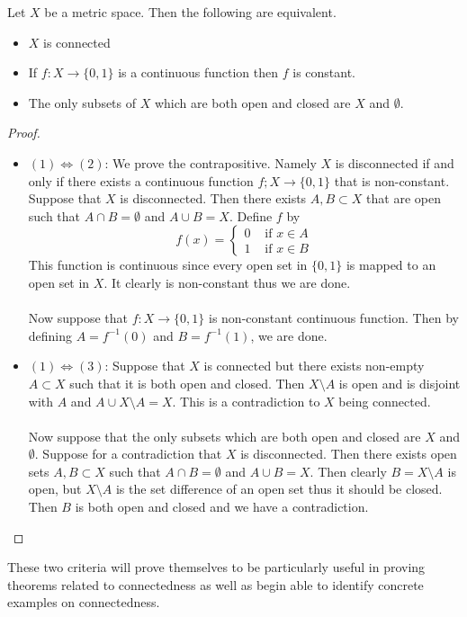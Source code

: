 \begin{prp}{}{} Let $X$ be a metric space. Then the following are equivalent. 
\begin{itemize}
\item $X$ is connected
\item If $f:X\to\{0,1\}$ is a continuous function then $f$ is constant. 
\item The only subsets of $X$ which are both open and closed are $X$ and $\emptyset$. 
\end{itemize} \tcbline
\begin{proof}~\\
\begin{itemize}
\item $(1)\iff(2)$: We prove the contrapositive. Namely $X$ is disconnected if and only if there exists a continuous function $f;X\to\{0,1\}$ that is non-constant. Suppose that $X$ is disconnected. Then there exists $A,B\subset X$ that are open such that $A\cap B=\emptyset$ and $A\cup B=X$. Define $f$ by $$f(x)=\begin{cases}
0 & \text{ if }x\in A\\
1 & \text{ if }x\in B
\end{cases}$$
This function is continuous since every open set in $\{0,1\}$ is mapped to an open set in $X$. It clearly is non-constant thus we are done. \\~\\
Now suppose that $f:X\to\{0,1\}$ is non-constant continuous function. Then by defining $A=f^{-1}(0)$ and $B=f^{-1}(1)$, we are done. 
\item $(1)\iff(3)$: Suppose that $X$ is connected but there exists non-empty $A\subset X$ such that it is both open and closed. Then $X\setminus A$ is open and is disjoint with $A$ and $A\cup X\setminus A=X$. This is a contradiction to $X$ being connected. \\~\\
Now suppose that the only subsets which are both open and closed are $X$ and $\emptyset$. Suppose for a contradiction that $X$ is disconnected. Then there exists open sets $A,B\subset X$ such that $A\cap B=\emptyset$ and $A\cup B=X$. Then clearly $B=X\setminus A$ is open, but $X\setminus A$ is the set difference of an open set thus it should be closed. Then $B$ is both open and closed and we have a contradiction. 
\end{itemize}
\end{proof}
\end{prp}

These two criteria will prove themselves to be particularly useful in proving theorems related to connectedness as well as begin able to identify concrete examples on connectedness. 

